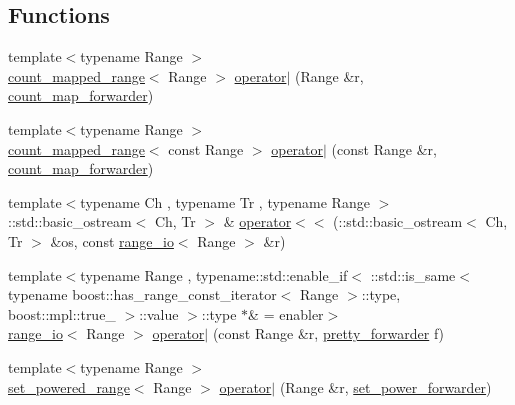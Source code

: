\subsection*{\-Functions}
\begin{DoxyCompactItemize}
\item 
{\footnotesize template$<$typename Range $>$ }\\\hyperlink{classyuh_1_1range__detail_1_1count__mapped__range}{count\-\_\-mapped\-\_\-range}$<$ \-Range $>$ \hyperlink{namespaceyuh_1_1range__detail_a128712717771a96265117e448135e6b8}{operator$|$} (\-Range \&r, \hyperlink{structyuh_1_1range__detail_1_1count__map__forwarder}{count\-\_\-map\-\_\-forwarder})
\item 
{\footnotesize template$<$typename Range $>$ }\\\hyperlink{classyuh_1_1range__detail_1_1count__mapped__range}{count\-\_\-mapped\-\_\-range}$<$ const \-Range $>$ \hyperlink{namespaceyuh_1_1range__detail_a5be2a0d7d9e02960bca7acc73d610efc}{operator$|$} (const \-Range \&r, \hyperlink{structyuh_1_1range__detail_1_1count__map__forwarder}{count\-\_\-map\-\_\-forwarder})
\item 
{\footnotesize template$<$typename Ch , typename Tr , typename Range $>$ }\\\-::std\-::basic\-\_\-ostream$<$ \-Ch, \-Tr $>$ \& \hyperlink{namespaceyuh_1_1range__detail_aab6775f4b199987b34c5ceb60336262f}{operator$<$$<$} (\-::std\-::basic\-\_\-ostream$<$ \-Ch, \-Tr $>$ \&os, const \hyperlink{structyuh_1_1range__detail_1_1range__io}{range\-\_\-io}$<$ \-Range $>$ \&r)
\item 
{\footnotesize template$<$typename Range , typename\-::std\-::enable\-\_\-if$<$ \-::std\-::is\-\_\-same$<$ typename boost\-::has\-\_\-range\-\_\-const\-\_\-iterator$<$ Range $>$\-::type, boost\-::mpl\-::true\-\_\- $>$\-::value $>$\-::type $\ast$\&  = enabler$>$ }\\\hyperlink{structyuh_1_1range__detail_1_1range__io}{range\-\_\-io}$<$ \-Range $>$ \hyperlink{namespaceyuh_1_1range__detail_a80175b98364b0c303ffdfcb32617ce4d}{operator$|$} (const \-Range \&r, \hyperlink{structyuh_1_1range__detail_1_1pretty__forwarder}{pretty\-\_\-forwarder} f)
\item 
{\footnotesize template$<$typename Range $>$ }\\\hyperlink{classyuh_1_1range__detail_1_1set__powered__range}{set\-\_\-powered\-\_\-range}$<$ \-Range $>$ \hyperlink{namespaceyuh_1_1range__detail_ade0b1e4024c0bba4ebcc9ba0a977512a}{operator$|$} (\-Range \&r, \hyperlink{structyuh_1_1range__detail_1_1set__power__forwarder}{set\-\_\-power\-\_\-forwarder})

\end{DoxyCompactItemize}
